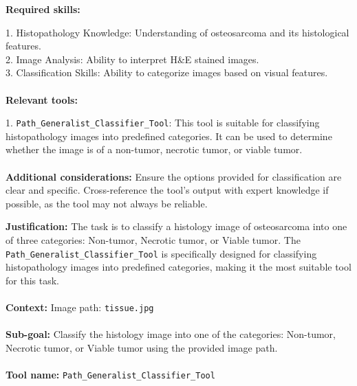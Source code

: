 \begin{plannerbox}
\textbf{Required skills:}

1. Histopathology Knowledge: Understanding of osteosarcoma and its histological features.\\
2. Image Analysis: Ability to interpret H\&E stained images.\\
3. Classification Skills: Ability to categorize images based on visual features.
\\\\
\textbf{Relevant tools:}

1. \texttt{Path\_Generalist\_Classifier\_Tool}: This tool is suitable for classifying histopathology images into predefined categories. It can be used to determine whether the image is of a non-tumor, necrotic tumor, or viable tumor.
\\\\
\textbf{Additional considerations:}
Ensure the options provided for classification are clear and specific. Cross-reference the tool's output with expert knowledge if possible, as the tool may not always be reliable.
\end{plannerbox}


\begin{plannerbox}

\textbf{Justification:}
The task is to classify a histology image of osteosarcoma into one of three categories: Non-tumor, Necrotic tumor, or Viable tumor. The \texttt{Path\_Generalist\_Classifier\_Tool} is specifically designed for classifying histopathology images into predefined categories, making it the most suitable tool for this task. 
\\\\
\textbf{Context:}
Image path: \texttt{tissue.jpg}
\\\\
\textbf{Sub-goal:}
Classify the histology image into one of the categories: Non-tumor, Necrotic tumor, or Viable tumor using the provided image path.
\\\\
\textbf{Tool name:} \texttt{Path\_Generalist\_Classifier\_Tool}
\end{plannerbox}


